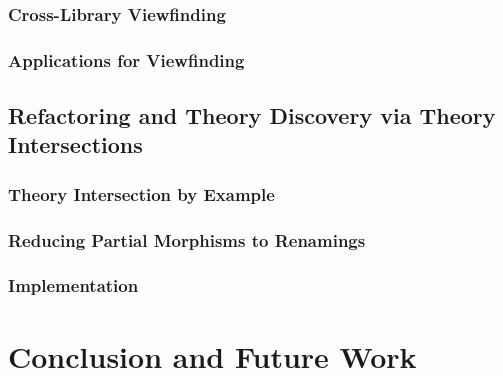 \documentclass[a4paper,11pt]{book}
\begin{document}
\section{Cross-Library Viewfinding}\label{sec:crosslib:vf:cross}


\section{Applications for Viewfinding}


\chapter{Refactoring and Theory Discovery via Theory Intersections}\label{sec:crosslib:intersect}


\section{Theory Intersection by Example}


\section{Reducing Partial Morphisms to Renamings}


\section{Implementation}


\part{Conclusion and Future Work}




\end{document}
